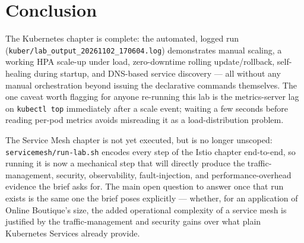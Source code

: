 \documentclass[a4paper,11pt]{article}
\begin{document}
\section{Conclusion}

The Kubernetes chapter is complete: the automated, logged run
(\texttt{kuber/lab\_output\_20261102\_170604.log}) demonstrates manual scaling, a working HPA
scale-up under load, zero-downtime rolling update/rollback, self-healing during startup, and
DNS-based service discovery — all without any manual orchestration beyond issuing the declarative
commands themselves. The one caveat worth flagging for anyone re-running this lab is the
metrics-server lag on \texttt{kubectl top} immediately after a scale event; waiting a few seconds
before reading per-pod metrics avoids misreading it as a load-distribution problem.

The Service Mesh chapter is not yet executed, but is no longer unscoped: \texttt{servicemesh/run-lab.sh}
encodes every step of the Istio chapter end-to-end, so running it is now a mechanical step that
will directly produce the traffic-management, security, observability, fault-injection, and
performance-overhead evidence the brief asks for. The main open question to answer once that run
exists is the same one the brief poses explicitly — whether, for an application of Online Boutique's
size, the added operational complexity of a service mesh is justified by the traffic-management and
security gains over what plain Kubernetes Services already provide.


\end{document}
